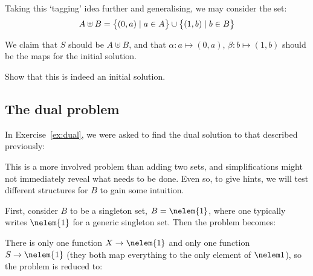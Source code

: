 Taking this `tagging' idea further and generalising, we may consider the set:
\begin{equation*}
A \uplus B = \big\{ (0, a) \mid a \in A \big\} \cup
\big\{ (1, b) \mid b \in B \big\}
\end{equation*}

We claim that $S$ should be $A \uplus B$, and that $\alpha: a \mapsto (0, a)$,
$\beta: b \mapsto (1, b)$ should be the maps for the initial solution.

\begin{exercise}
Show that this is indeed an initial solution.
\end{exercise}

\subsection{The dual problem}

In Exercise~\ref{ex:dual}, we were asked to find the dual solution to that
described previously:
\begin{center}
\end{center}

This is a more involved problem than adding two sets, and simplifications might
not immediately reveal what needs to be done. Even so, to give hints, we will test
different structures for $B$ to gain some intuition.

First, consider $B$ to be a singleton set, $B = \nelem{1}$, where one
typically writes $\nelem{1}$ for a generic singleton set.  Then the problem
becomes:
\begin{center}
\end{center}

There is only one function $X \to \nelem{1}$ and only one function $S \to
\nelem{1}$ (they both map everything to the only element of $\nelem 1$), so
the problem is reduced to:
\begin{center}
\end{center}

